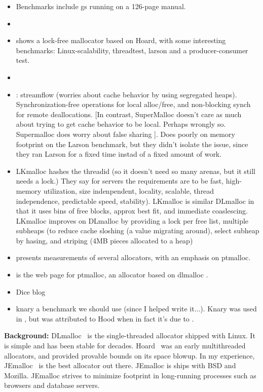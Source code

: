 \documentclass[pldi]{sigplanconf-pldi15}
\begin{document}
\begin{itemize}
\item \cite{DetlefsDoZo94} Benchmarks include gs running on a 126-page manual.
\item \cite{HudsonSaAd06}
\item \cite{Michael04} shows a lock-free mallocator based on Hoard, with some interesting benchmarks: Linux-scalability, threadtest, larson and a producer-consumer test.
\item \cite{FengBe05}
\item \cite{SchneiderAnNi06}: streamflow (worries about cache behavior by using segregated heaps).  Synchronization-free operations for local alloc/free, and non-blocking synch for remote deallocations.  [In contrast, SuperMalloc doesn't care as much about trying to get cache behavior to be local.  Perhaps wrongly so.  Supermalloc does worry about false sharing  ].  Does poorly on memory footprint on the Larson benchmark, but they didn't isolate the issue, since they ran Larson for a fixed time instad of a fixed amount of work.
\item \cite{LarsonKr98} LKmalloc hashes the threadid (so it doesn't need so many arenas, but it still needs a lock.)  They say for servers the requirements are to be fast, high-memory utilization, size indenpendent, locality, scalable, thread independence, predictable speed, stability).  LKmalloc is similar DLmalloc in that it uses bins of free blocks, approx best fit, and immediate coaslescing.  LKmalloc improves on DLmalloc by providing a lock per free list, multiple subheaps (to reduce cache sloshing (a value migrating around), select subheap by hasing, and striping (4MB pieces allocated to a heap)
\item \cite{Gloger12} presents measurements of several allocators, with an emphasis on ptmalloc.
\item \cite{Gloger06} is the web page for ptmalloc, an allocator based on dlmalloc \cite{Lea96}.
\item Dice blog
\item knary a benchmark we should use (since I helped write
  it...).  Knary was used in \cite{SchneiderAnNi06}, but was
  attributed to Hood when in fact it's due to \cite{BlumofeJoKu96}.
\end{itemize}


{\bf Background:} DLmalloc~\cite{Lea96} is the single-threaded
allocator shipped with Linux.  It is simple and has been stable for
decades.  Hoard~\cite{BergerMcBl00} was an early multithreaded
allocators, and provided provable bounds on its space blowup.  In my
experience, JEmalloc~\cite{Evans06} is the best allocator out there.
JEmalloc is ships with BSD and Mozilla.  JEmalloc strives to minimize
footprint in long-running processes such as browsers and database
servers.
\end{document}
